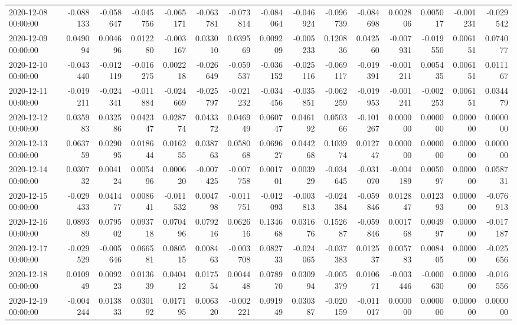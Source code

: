\begin{tabular}{lrrrrrrrrrrrrrr}
2020-12-08 00:00:00 & -0.088133 & -0.058647 & -0.045756 & -0.065171 & -0.063781 & -0.073814 & -0.084064 & -0.046924 & -0.096739 & -0.084698 & 0.002806 & 0.005017 & -0.001231 & -0.029542 \\
2020-12-09 00:00:00 & 0.049094 & 0.004696 & 0.012280 & -0.003167 & 0.033010 & 0.039569 & 0.009209 & -0.005233 & 0.120836 & 0.042560 & -0.007931 & -0.019550 & 0.006151 & 0.074077 \\
2020-12-10 00:00:00 & -0.043440 & -0.012119 & -0.016275 & 0.002218 & -0.026649 & -0.059537 & -0.036152 & -0.025116 & -0.069117 & -0.019391 & -0.001211 & 0.005435 & 0.006151 & 0.011167 \\
2020-12-11 00:00:00 & -0.019211 & -0.024341 & -0.011884 & -0.024669 & -0.025797 & -0.021232 & -0.034456 & -0.035851 & -0.062259 & -0.019953 & -0.001241 & -0.002253 & 0.006151 & 0.034479 \\
2020-12-12 00:00:00 & 0.035983 & 0.032586 & 0.042347 & 0.028774 & 0.043372 & 0.046949 & 0.060747 & 0.046192 & 0.050366 & -0.101267 & 0.000000 & 0.000000 & 0.000000 & 0.000000 \\
2020-12-13 00:00:00 & 0.063759 & 0.029095 & 0.018644 & 0.016255 & 0.038763 & 0.058068 & 0.069627 & 0.044268 & 0.103974 & 0.012747 & 0.000000 & 0.000000 & 0.000000 & 0.000000 \\
2020-12-14 00:00:00 & 0.030732 & 0.004124 & 0.005496 & 0.000620 & -0.007425 & -0.007758 & 0.001701 & 0.003929 & -0.034645 & -0.031070 & -0.004189 & 0.005097 & 0.000000 & 0.058731 \\
2020-12-15 00:00:00 & -0.029433 & 0.041477 & 0.008641 & -0.011532 & 0.004798 & -0.011751 & -0.012093 & -0.003813 & -0.024384 & -0.059846 & 0.012847 & 0.012393 & 0.000000 & -0.076913 \\
2020-12-16 00:00:00 & 0.089389 & 0.079502 & 0.093718 & 0.070496 & 0.079216 & 0.062616 & 0.134668 & 0.031676 & 0.152687 & -0.059846 & 0.001768 & 0.004997 & 0.000000 & -0.017187 \\
2020-12-17 00:00:00 & -0.029529 & -0.005646 & 0.066581 & 0.080515 & 0.008463 & -0.003708 & 0.082733 & -0.024065 & -0.037383 & 0.012537 & 0.005783 & 0.008405 & 0.000000 & -0.025656 \\
2020-12-18 00:00:00 & 0.010949 & 0.009223 & 0.013639 & 0.040412 & 0.017554 & 0.004448 & 0.078970 & 0.030994 & -0.005379 & 0.010671 & -0.003446 & -0.000630 & 0.000000 & -0.016556 \\
2020-12-19 00:00:00 & -0.004244 & 0.013833 & 0.030192 & 0.017195 & 0.006320 & -0.002221 & 0.091949 & 0.030387 & -0.020159 & -0.011017 & 0.000000 & 0.000000 & 0.000000 & 0.000000 \\

\end{tabular}
